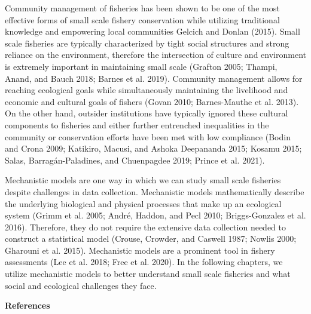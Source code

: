 \documentclass[
]{article}
\begin{document}
Community management of fisheries has been shown to be one of the most effective forms of small scale fishery conservation while utilizing traditional knowledge and empowering local communities Gelcich and Donlan (2015). Small scale fisheries are typically characterized by tight social structures and strong reliance on the environment, therefore the intersection of culture and environment is extremely important in maintaining small scale (Grafton 2005; Thampi, Anand, and Bauch 2018; Barnes et al. 2019). Community management allows for reaching ecological goals while simultaneously maintaining the livelihood and economic and cultural goals of fishers (Govan 2010; Barnes-Mauthe et al. 2013). On the other hand, outsider institutions have typically ignored these cultural components to fisheries and either further entrenched inequalities in the community or conservation efforts have been met with low compliance (Bodin and Crona 2009; Katikiro, Macusi, and Ashoka Deepananda 2015; Kosamu 2015; Salas, Barragán-Paladines, and Chuenpagdee 2019; Prince et al. 2021).

Mechanistic models are one way in which we can study small scale fisheries despite challenges in data collection. Mechanistic models mathematically describe the underlying biological and physical processes that make up an ecological system (Grimm et al. 2005; André, Haddon, and Pecl 2010; Briggs-Gonzalez et al. 2016). Therefore, they do not require the extensive data collection needed to construct a statistical model (Crouse, Crowder, and Caswell 1987; Nowlis 2000; Gharouni et al. 2015). Mechanistic models are a prominent tool in fishery assessments (Lee et al. 2018; Free et al. 2020). In the following chapters, we utilize mechanistic models to better understand small scale fisheries and what social and ecological challenges they face.

\newpage

\textbf{References}
\end{document}
